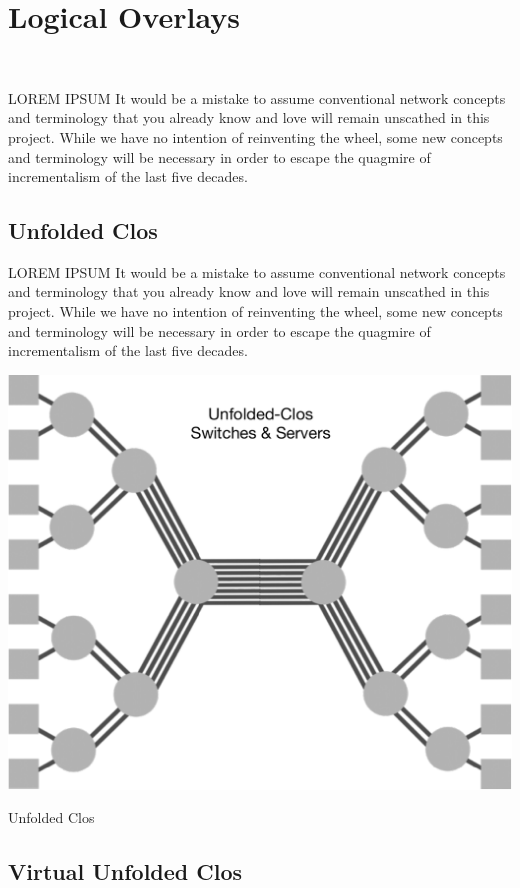\clearpage
\section{Logical Overlays}\

LOREM IPSUM It would be a mistake to assume conventional network concepts and terminology that you already know and love will remain unscathed in this project. While we have no intention of reinventing the wheel,  some new concepts and terminology will be necessary in order to escape the quagmire of incrementalism of the last five decades.  

\subsection{Unfolded Clos}

LOREM IPSUM It would be a mistake to assume conventional network concepts and terminology that you already know and love will remain unscathed in this project. While we have no intention of reinventing the wheel,  some new concepts and terminology will be necessary in order to escape the quagmire of incrementalism of the last five decades.  

 \begin{marginfigure}
  \includegraphics[width=1.2\linewidth]{../../FIGURES/Unfolded-Clos.pdf}
   \caption{Unfolded Clos}
      \vspace{2em}
\end{marginfigure}

\subsection{Virtual Unfolded Clos}

